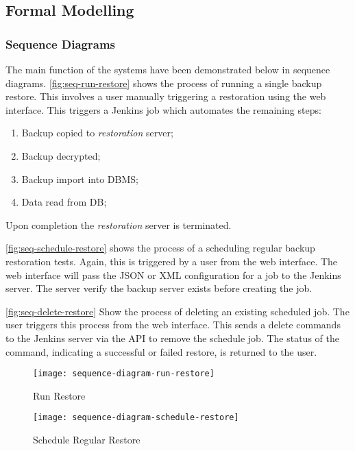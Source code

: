 	\subsection{Formal Modelling}
	\subsubsection{Sequence Diagrams}
		The main function of the systems have been demonstrated below in sequence diagrams. \autoref{fig:seq-run-restore} shows the process of running a single backup restore. This involves a user manually triggering a restoration using the web interface. This triggers a Jenkins job which automates the remaining steps:
		\begin{enumerate}
			\item Backup copied to \textit{restoration} server;
			\item Backup decrypted;
			\item Backup import into DBMS;
			\item Data read from DB;
		\end{enumerate}
		Upon completion the \textit{restoration} server is terminated.

		\autoref{fig:seq-schedule-restore} shows the process of a scheduling regular backup restoration tests. Again, this is triggered by a user from the web interface. The web interface will pass the JSON or XML configuration for a job to the Jenkins server. The server verify the backup server exists before creating the job.
		
		\autoref{fig:seq-delete-restore} Show the process of deleting an existing scheduled job. The user triggers this process from the web interface. This sends a delete commands to the Jenkins server via the API to remove the schedule job. The status of the command, indicating a successful or failed restore, is returned to the user.
		
		\begin{figure}[H]
			\setlength{\belowcaptionskip}{15pt plus 3pt minus 2pt}
			\caption{Run Restore}
			\centering
			\texttt{[image: sequence-diagram-run-restore]}
			\label{fig:seq-run-restore}
		\end{figure}
		
		\begin{figure}[H]
			\setlength{\belowcaptionskip}{15pt plus 3pt minus 2pt}
			\caption{Schedule Regular Restore}
			\centering
			\texttt{[image: sequence-diagram-schedule-restore]}
			\label{fig:seq-schedule-restore}
		\end{figure}
		
